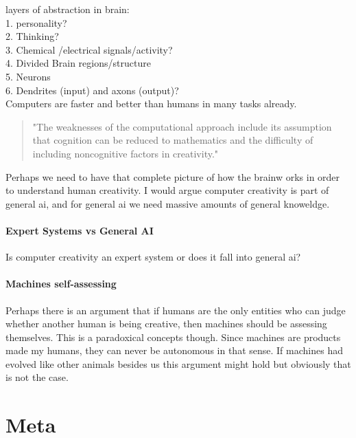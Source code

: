 {layers of abstraction in brain:\\
1.	personality?\\
2.	Thinking?\\
3.	Chemical /electrical signals/activity?\\
4.	Divided Brain regions/structure\\
5.	Neurons\\
6.	Dendrites (input) and axons (output)?\\


Computers are faster and better than humans in many tasks already.

\begin{quote}
"The weaknesses of the computational approach include its assumption that cognition can be reduced to mathematics and the difficulty of including noncognitive factors in creativity." \autocite[p.457]{Mayer1999}
\end{quote}


Perhaps we need to have that complete picture of how the brainw orks in order to understand human creativity. I would argue computer creativity is part of general \gls{ai}, and for general \gls{ai} we need massive amounts of general knoweldge.
\paragraph{Expert Systems vs General AI}
Is computer creativity an expert system or does it fall into general \gls{ai}? 

\paragraph{Machines self-assessing}
Perhaps there is an argument that if humans are the only entities who can judge whether another human is being creative, then machines should be assessing themselves. This is a paradoxical concepts though. Since machines are products made my humans, they can never be autonomous in that sense. If machines had evolved like other animals besides us this argument might hold but obviously that is not the case.



\section{Meta}

}
